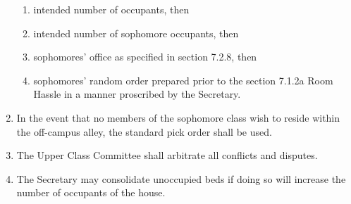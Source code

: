 \documentclass[10pt]{article} %
\begin{document}
\begin{enumerate}
\begin{enumerate}
\item intended number of occupants, then
\item intended number of sophomore occupants, then
\item sophomores’ office as specified in section 7.2.8, then
\item sophomores’ random order prepared prior to the section 7.1.2a Room Hassle in a manner proscribed by the Secretary.
\end{enumerate}
\item In the event that no members of the sophomore class wish to reside within the off-campus alley, the standard pick order shall be used. 
\item The Upper Class Committee shall arbitrate all conflicts and disputes.
\item The Secretary may consolidate unoccupied beds if doing so will increase the number of occupants of the house.
\end{enumerate}
\end{document}
